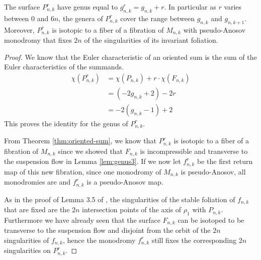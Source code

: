\begin{lem}
  The surface $P^r_{n,k}$ have genus equal to $g^r_{n,k} = g_{n,k} + r$. In particular as $r$ varies between
  $0$ and $6n$, the genera of $P^r_{n,k}$ cover the range between $g_{n,k}$ and $g_{n,k+1}$. Moreover,
  $P^r_{n,k}$ is isotopic to a fiber of a fibration of $M_{n,k}$ with pseudo-Anosov monodromy that fixes $2n$
  of the singularities of its invariant foliation.
\end{lem}

\begin{proof}
  We know that the Euler characteristic of an oriented sum is the sum of the Euler characteristics of the summands.
  \begin{align*}
    \chi(P^r_{n,k}) &= \chi(P_{n,k}) + r\cdot\chi(F_{n,k}) \\
                    &= (-2g_{n,k} + 2)-2r \\
                    &= -2(g_{n,k} - 1) + 2
  \end{align*}
  This proves the identity for the genus of $P^r_{n,k}.$

  From Theorem \ref{thm:oriented-sum}, we know that $P^r_{n,k}$ is isotopic to a fiber of a fibration of
  $M_{n,k}$ since we showed that $F_{n,k}$ is incompressible and transverse to the suspension flow in Lemma
  \ref{lem:genus3}. If we now let $f^r_{n,k}$ be the first return map of this new fibration, since one
  monodromy of $M_{n,k}$ is pseudo-Anosov, all monodromies are and $f^r_{n,k}$ is a pseudo-Anosov map.

  As in the proof of Lemma 3.5 of \cite{yazdi2018pseudo}, the singularities of the stable foliation of
  $f_{n,k}$ that are fixed are the $2n$ intersection points of the axis of $\rho_1$ with
  $P_{n,k}$. Furthermore we have already seen that the surface $F_{n,k}$ can be isotoped to be transverse to
  the suspension flow and disjoint from the orbit of the $2n$ singularities of $f_{n,k}$, hence the monodromy
  $f^r_{n,k}$ still fixes the corresponding $2n$ singularities on $P^r_{n,k}$.
\end{proof}

